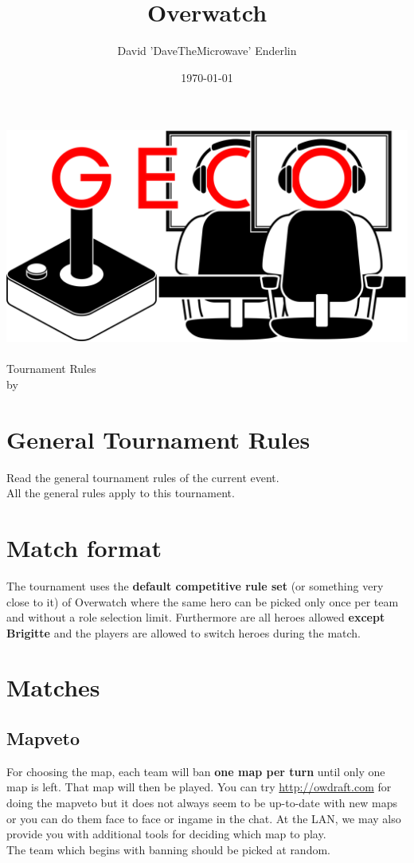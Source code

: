 \documentclass{article}
\title{Overwatch}
\author{David 'DaveTheMicrowave' Enderlin}
\date{\today}
\begin{document}
\makeatletter
\begin{titlepage}
\centering
\includegraphics[scale=0.075]{../img/GECo.png}\\
\LARGE \@title\\ Tournament Rules\\ \normalsize by \@author\\ \@date
\end{titlepage}
\makeatother

\clearpage

\tableofcontents
\clearpage

\section{General Tournament Rules}
Read the general tournament rules of the current event.\\
All the general rules apply to this tournament.

\section{Match format}
The tournament uses the \textbf{default competitive rule set} (or something very close to it) of Overwatch where the same hero can be picked only once per team and without a role selection limit. Furthermore are all heroes allowed \textbf{except Brigitte} and the players are allowed to switch heroes during the match.

\section{Matches}
\subsection{Mapveto}
For choosing the map, each team will ban \textbf{one map per turn} until only one map is left. That map will then be played.
You can try \url{http://owdraft.com} for doing the mapveto but it does not always seem to be up-to-date with new maps
or you can do them face to face or ingame in the chat. At the LAN, we may also provide you with additional tools
for deciding which map to play. \\
The team which begins with banning should be picked at random.
\end{document}
